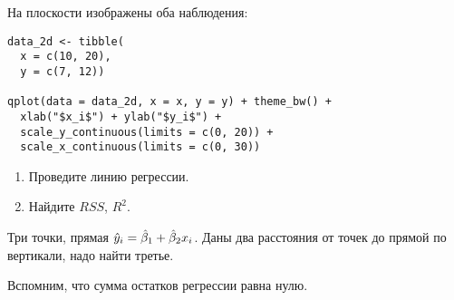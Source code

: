 \begin{problem}
На плоскости изображены оба наблюдения:

\begin{verbatim}
data_2d <- tibble(
  x = c(10, 20),
  y = c(7, 12))

qplot(data = data_2d, x = x, y = y) + theme_bw() +
  xlab("$x_i$") + ylab("$y_i$") +
  scale_y_continuous(limits = c(0, 20)) +
  scale_x_continuous(limits = c(0, 30))
\end{verbatim}



\begin{minipage}{0.6\textwidth}
\begin{center}
\begin{tikzpicture}[scale = 0.025]

\end{tikzpicture}
\end{center}
\end{minipage}

\begin{enumerate}
\item Проведите линию регрессии.
\item Найдите $RSS$, $R^2$.
\end{enumerate}

\begin{sol}
\end{sol}
\end{problem}


\begin{problem}
Три точки, прямая $\hy_i = \hb_1 + \hb_2 x_i$. Даны два расстояния от точек до прямой по вертикали, надо найти третье.
\begin{sol}
Вспомним, что сумма остатков регрессии равна нулю.
\end{sol}
\end{problem}

